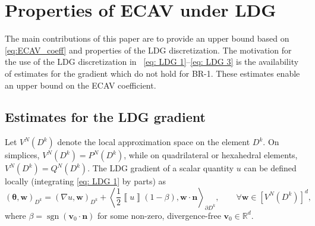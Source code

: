 \documentclass{elsarticle}
\theoremstyle{definition}
\theoremstyle{plain}
\theoremstyle{plain}
\newcommand{\LRp}[1]{\left( #1 \right)} %
\newcommand{\LRs}[1]{\left[ #1 \right]} %
\newcommand{\LRa}[1]{\left\langle #1 \right\rangle} %
\newcommand{\jump}[1] {\ensuremath{\left\llbracket#1\right\rrbracket}} %
\DeclareMathOperator{\sgn}{sgn}
\newcommand{\refone}[1]{{\color{red}#1}}
\newcommand{\reftwo}[1]{{\color{blue}#1}}
\renewcommand{\refone}[1]{#1}
\renewcommand{\reftwo}[1]{#1}
\begin{document}
\section{Properties of ECAV under LDG}\label{sec:section_4}

The main contributions of this paper are to provide an upper bound based on \eqref{eq:ECAV_coeff} and properties of the LDG discretization. The motivation for the use of the LDG discretization in \reftwo{~\eqref{eq: LDG 1}--\eqref{eq: LDG 3}} is the availability of estimates for the gradient which do not hold for BR-1. These estimates enable an upper bound on the ECAV coefficient. 

\subsection{Estimates for the LDG gradient}

Let $V^N(D^k)$ denote the local approximation space on the element $D^k$. On simplices, $V^N(D^k) = P^N(D^k)$, while on quadrilateral or hexahedral elements, $V^N(D^k) = Q^N(D^k)$. The LDG gradient of a scalar quantity $u$ can be defined locally (integrating \eqref{eq: LDG 1} by parts) as
\begin{equation}
\LRp{\bm{\theta}, \bm{w}}_{D^k} = \LRp{\nabla u, \bm{w}}_{D^k} + \LRa{\frac{1}{2}\jump{u}\LRp{1 - \beta}, \bm{w}\cdot \bm{n}}_{\partial D^k}\refone{,} \qquad \forall \bm{w} \in \LRs{V^{N}(D^k)}^d,
\label{eq:ldg_grad}
\end{equation}
where $\beta = \refone{\sgn{(\bm{v}_0 \cdot\bm{n})}}$ for some \reftwo{non-zero,} divergence-free $\bm{v}_0 \in \mathbb{R}^d$.
\end{document}

